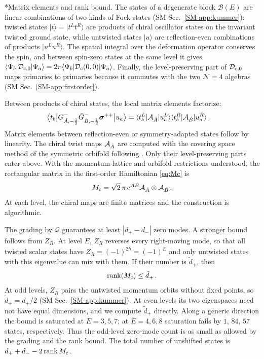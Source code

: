 \documentclass[aps,twocolumn,preprintnumbers,groupedaddress,nofootinbib,prl]{revtex4-2}
\makeatletter
\renewcommand\paragraph{\@startsection{paragraph}{4}{\parindent}{\z@}{-1em}{\normalfont\normalsize\bfseries}}
\newcommand{\Def}{\mathcal D}
\newcommand{\B}{\mathcal B}
\newcommand{\cMat}{{\rm c}}
\newcommand{\twist}{{\boldsymbol\sigma}}
\newcommand{\Dc}{\Def_{\cMat}}
\newcommand{\Mc}{M_{\cMat}}
\newcommand{\Dcz}{\Def_{\cMat,0}}
\DeclareMathOperator{\rank}{rank}
\makeatother
\begin{document}
\paragraph*{Matrix elements and rank bound.}
The states of a degenerate block $\B(E)$ are linear combinations of two kinds of Fock states (SM Sec.~\ref{SM-app:kummer}): twisted states $|t\rangle=|t^Lt^R\rangle$ are products of chiral oscillator states on the invariant twisted ground state, while untwisted states $|u\rangle$ are reflection-even combinations of products $|u^Lu^R\rangle$. The spatial integral over the deformation operator conserves the spin, and between spin-zero states at the same level it gives $\langle\Psi_b|\Dcz|\Psi_a\rangle=2\pi\langle\Psi_b|\Dc(0,0)|\Psi_a\rangle$. Finally, the level-preserving part of $\Dcz$ maps primaries to primaries because it commutes with the two $\mathcal N=4$ algebras (SM Sec.~\ref{SM-app:firstorder}).

Between products of chiral states, the local matrix elements factorize:
\begin{equation}
\label{eq:factor}
\begin{aligned}
&\big\langle t_b\big|G^{-}_{\dot A,-\frac12}
 \bar G^{-}_{\dot B,-\frac12}\twist^{++}
 \big|u_a\big\rangle=\langle t_b^L|{\cal A}_{\dot A}|u_a^L\rangle
         \langle t_b^R|{\cal A}_{\dot B}|u_a^R\rangle\,.
\end{aligned}
\end{equation}
Matrix elements between reflection-even or symmetry-adapted states follow by linearity. The chiral twist maps ${\cal A}_{\dot A}$ are computed with the covering space method of the symmetric orbifold following \cite{Lunin:2001pw,Avery:2010er,Guo:2019ady}. Only their level-preserving parts enter above. With the momentum-lattice and orbifold restrictions understood, the rectangular matrix in the first-order Hamiltonian \eqref{eq:Mc} is
\begin{equation}
\label{eq:Mc-chiral}
\Mc=\sqrt2\,\pi\,\cMat^{\dot A\dot B}
{\cal A}_{\dot A}\otimes{\cal A}_{\dot B}\,.
\end{equation}
At each level, the chiral maps are finite matrices and the construction is algorithmic.

The grading by $\mathcal Q$ guarantees at least $|d_+-d_-|$ zero modes. A stronger bound follows from $Z_R$. At level $E$, $Z_R$ reverses every right-moving mode, so that all twisted scalar states have $Z_R=(-1)^{2\bar h}=(-1)^E$ and only untwisted states with this eigenvalue can mix with them. If their number is $\tilde d_+$, then
\begin{equation}
\label{eq:rankbound}
\rank(\Mc)\le\tilde d_+\,.
\end{equation}
At odd levels, $Z_R$ pairs the untwisted momentum orbits without fixed points, so $\tilde d_+=d_+/2$ (SM Sec.~\ref{SM-app:kummer}). At even levels its two eigenspaces need not have equal dimensions, and we compute $\tilde d_+$ directly. Along a generic direction the bound is saturated at $E=3,5,7$; at $E=4,6,8$ saturation fails by $1$, $84$, $57$ states, respectively. Thus the odd-level zero-mode count is as small as allowed by the grading and the rank bound. The total number of unshifted states is $d_++d_--2\rank\Mc$.\\
\end{document}
